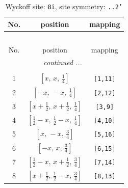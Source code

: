 \documentclass[fleqn,8pt]{jsarticle}
\begin{document}
\begin{longtable}{ccc}
\caption{Wyckoff site: {\tt 8i}, site symmetry: {\tt ..2'}}
 \\
 \hline \hline
No. & position & mapping \\ \hline \endfirsthead

\multicolumn{2}{l}{\tablename\ \thetable{}} \\
 \hline \hline
No. & position & mapping \\ \hline \endhead

 \hline \hline
\multicolumn{2}{r}{\footnotesize\it continued ...} \\ \endfoot

 \hline \hline
\multicolumn{2}{r}{} \\ \endlastfoot

1 & $\left[ x,\, x,\, \frac{1}{4} \right]$ & {\tt [1,11]} \\ \hline
2 & $\left[ - x,\, - x,\, \frac{1}{4} \right]$ & {\tt [2,12]} \\ \hline
3 & $\left[ x + \frac{1}{2},\, x + \frac{1}{2},\, \frac{1}{4} \right]$ & {\tt [3,9]} \\ \hline
4 & $\left[ \frac{1}{2} - x,\, \frac{1}{2} - x,\, \frac{1}{4} \right]$ & {\tt [4,10]} \\ \hline
5 & $\left[ x,\, - x,\, \frac{3}{4} \right]$ & {\tt [5,16]} \\ \hline
6 & $\left[ - x,\, x,\, \frac{3}{4} \right]$ & {\tt [6,15]} \\ \hline
7 & $\left[ \frac{1}{2} - x,\, x + \frac{1}{2},\, \frac{3}{4} \right]$ & {\tt [7,14]} \\ \hline
8 & $\left[ x + \frac{1}{2},\, \frac{1}{2} - x,\, \frac{3}{4} \right]$ & {\tt [8,13]} \\
\end{longtable}
\renewcommand{\arraystretch}{1.2}
\end{document}
